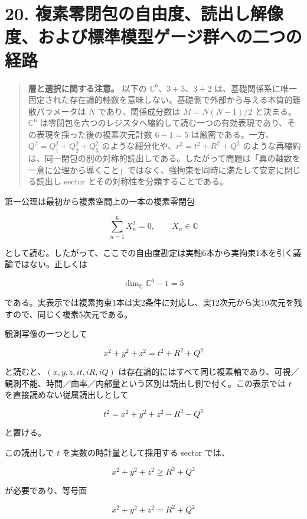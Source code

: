 \documentclass[
  a4paper,
]{ltjsarticle}
\begin{document}
\section{20.
複素零閉包の自由度、読出し解像度、および標準模型ゲージ群への二つの経路}\label{ux8907ux7d20ux96f6ux9589ux5305ux306eux81eaux7531ux5ea6ux8aadux51faux3057ux89e3ux50cfux5ea6ux304aux3088ux3073ux6a19ux6e96ux6a21ux578bux30b2ux30fcux30b8ux7fa4ux3078ux306eux4e8cux3064ux306eux7d4cux8def}

\begin{quote}
\textbf{層と選択に関する注意。} 以下の \(\mathbb C^6\)、\(3+3\)、\(3+2\)
は、基礎関係系に唯一固定された存在論的軸数を意味しない。基礎側で外部から与える本質的離散パラメータは
\(N\) であり、関係成分数は \(M=N(N-1)/2\) と決まる。\(\mathbb C^6\)
は零閉包を六つのレジスタへ縮約して読む一つの有効表現であり、その表現を採った後の複素次元計数
\(6-1=5\) は厳密である。一方、\(Q^2=Q_1^2+Q_2^2+Q_3^2\)
のような細分化や、\(r^2=t^2+R^2+Q^2\)
のような再縮約は、同一閉包の別の対称的読出しである。したがって問題は「真の軸数を一意に公理から導くこと」ではなく、強拘束を同時に満たして安定に閉じる読出し
sector とその対称性を分類することである。
\end{quote}

第一公理は最初から複素空間上の一本の複素零閉包

\[
\boxed{\sum_{n=1}^{6}X_n^2=0,\qquad X_n\in\mathbb C}
\]

として読む。したがって、ここでの自由度勘定は実軸6本から実拘束1本を引く議論ではない。正しくは

\[
\boxed{\dim_{\mathbb C}\mathbb C^6-1=5}
\]

である。実表示では複素拘束1本は実2条件に対応し、実12次元から実10次元を残すので、同じく複素5次元である。

観測写像の一つとして

\[
\boxed{x^2+y^2+z^2=t^2+R^2+Q^2}
\]

と読むと、\((x,y,z,it,iR,iQ)\)
は存在論的にはすべて同じ複素軸であり、可視／観測不能、時間／曲率／内部量という区別は読出し側で付く。この表示では
\(t\) を直接読めない従属読出しとして

\[
\boxed{t^2=x^2+y^2+z^2-R^2-Q^2}
\]

と置ける。

この読出しで \(t\) を実数の時計量として採用する sector では、

\[
\boxed{
x^2+y^2+z^2\ge R^2+Q^2
}
\]

が必要であり、等号面

\[
\boxed{
x^2+y^2+z^2=R^2+Q^2
}
\]
\end{document}
